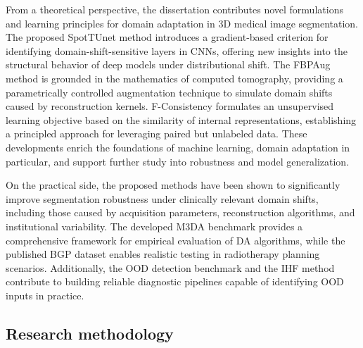 From a theoretical perspective, the dissertation contributes novel formulations and learning principles for domain adaptation in 3D medical image segmentation. The proposed SpotTUnet method introduces a gradient-based criterion for identifying domain-shift-sensitive layers in CNNs, offering new insights into the structural behavior of deep models under distributional shift. The FBPAug method is grounded in the mathematics of computed tomography, providing a parametrically controlled augmentation technique to simulate domain shifts caused by reconstruction kernels. F-Consistency formulates an unsupervised learning objective based on the similarity of internal representations, establishing a principled approach for leveraging paired but unlabeled data. These developments enrich the foundations of machine learning, domain adaptation in particular, and support further study into robustness and model generalization.

On the practical side, the proposed methods have been shown to significantly improve segmentation robustness under clinically relevant domain shifts, including those caused by acquisition parameters, reconstruction algorithms, and institutional variability. The developed M3DA benchmark provides a comprehensive framework for empirical evaluation of DA algorithms, while the published BGP dataset enables realistic testing in radiotherapy planning scenarios. Additionally, the OOD detection benchmark and the IHF method contribute to building reliable diagnostic pipelines capable of identifying OOD inputs in practice. %



\subsection*{Research methodology}

